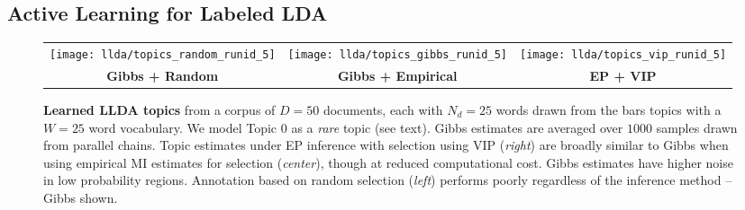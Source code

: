 \subsection{Active Learning for Labeled LDA}\label{sec:llda}

    

\begin{figure*}
  \begin{tabular}{ccc}
    \hspace{-3mm}\texttt{[image: llda/topics\_random\_runid\_5]} &
    \texttt{[image: llda/topics\_gibbs\_runid\_5]} &
    \texttt{[image: llda/topics\_vip\_runid\_5]} \vspace{-3mm}\\
    {\small\textbf{Gibbs + Random}} & {\small\textbf{Gibbs +
        Empirical}} & {\small\textbf{EP + VIP}}
  \end{tabular}

  \caption{\small \textbf{Learned LLDA topics} from a corpus of $D=50$
    documents, each with $N_d=25$ words drawn from the bars topics
    with a $W=25$ word vocabulary.  We model Topic 0 as a \emph{rare}
    topic (see text).  Gibbs estimates are averaged over $1000$
    samples drawn from parallel chains.  Topic estimates under EP
    inference with selection using VIP (\emph{right}) are broadly
    similar to Gibbs when using empirical MI estimates for selection
    (\emph{center}), though at reduced computational cost.  Gibbs
    estimates have higher noise in low probability regions.
    Annotation based on random selection (\emph{left}) performs poorly
    regardless of the inference method -- Gibbs shown.}
  \vspace{-5mm}
  \label{fig:llda_topics}
\end{figure*}

